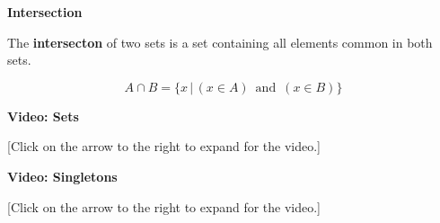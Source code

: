 \documentclass{ximera}
\begin{document}
\begin{definition} \textbf{\textcolor{green!50!black}{Intersection}}

The \textbf{intersecton} of two sets is a set containing all elements common in both sets.


\[
A \cap B = \{  x \, | \, (x \in A) \, \text{ and } \, (x \in B)  \}
\]


\end{definition}




\begin{explanation} \textbf{Video: Sets}

[Click on the arrow to the right to expand for the video.]
\begin{expandable} 

\begin{center}
\end{center}

\end{expandable}
\end{explanation}



\begin{explanation} \textbf{Video: Singletons}

[Click on the arrow to the right to expand for the video.]
\begin{expandable} 

\begin{center}
\end{center}

\end{expandable}
\end{explanation}
\end{document}
